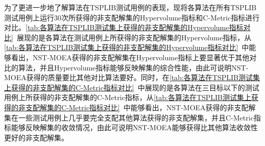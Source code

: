 \par
为了更进一步地了解算法在TSPLIB测试用例的表现，现将各算法在所有TSPLIB测试用例上运行30次所获得的非支配解集的Hypervolume指标和C-Metric指标进行对比。\autoref{tab:各算法在TSPLIB测试集上获得的非支配解集的Hypervolume指标对比}~展现的是各算法在测试用例上所获得的非支配解集的Hypervolume指标，从\autoref{tab:各算法在TSPLIB测试集上获得的非支配解集的Hypervolume指标对比}~中能够看出，NST-MOEA获得的非支配解集在Hypervolume指标上要显著优于其他对比的算法，并且Hypervolume指标能够反映解集的综合性能，由此可说明NST-MOEA获得的质量要比其他对比算法要好。同时，在\autoref{tab:各算法在TSPLIB测试集上获得的非支配解集的C-Metric指标对比}~中展现的是各算法在三目标以下的测试用例上所获得的非支配解集的C-Metric指标，从\autoref{tab:各算法在TSPLIB测试集上获得的非支配解集的C-Metric指标对比}~中能够看出，NST-MOEA获得的非支配解集在一些测试用例上几乎要完全支配其他算法获得的非支配解集，并且C-Metric指标能够反映解集的收敛情况，由此可说明NST-MOEA能够获得比其他算法收敛性更好的非支配解集。
